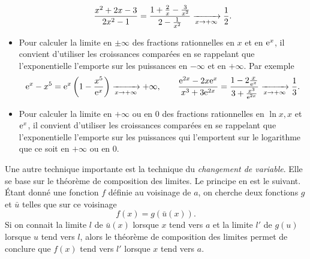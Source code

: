 \documentclass{magnoliaold}
\begin{document}
\begin{remarques}
\begin{itemize}
 $$\frac{x^2+2x-3}{2x^2-1}=\frac{1+\frac{2}{x}-\frac{3}{x^2}}
                           {2-\frac{1}{x^2}}\xrightarrow[x\rightarrow +\infty]{}\frac{1}{2}.$$
\item Pour calculer la limite en $\pm\infty$ des fractions rationnelles en $x$
  et en ${\rm e}^x$, il convient d'utiliser les croissances comparées en se
  rappelant que l'exponentielle l'emporte sur les puissances
  en $-\infty$ et en $+\infty$. Par exemple
  \[{\rm e}^x-x^5={\rm e}^x\left(1-\frac{x^5}{{\rm e}^x}\right)\xrightarrow[x\rightarrow +\infty]{} +\infty, \qquad
    \frac{{\rm e}^{2x}-2x{\rm e}^x}{x^3+3{\rm e}^{2x}}=\frac{1-2\frac{x}{{\rm e}^x}}
    {3+\frac{x^3}{{\rm e}^{2x}}}\xrightarrow[x\rightarrow +\infty]{}\frac{1}{3}.\]
\item Pour calculer la limite en $+\infty$ ou en $0$ des fractions rationnelles
  en $\ln x,x$ et ${\rm e}^x$, il convient d'utiliser les croissances comparées en se
  rappelant que l'exponentielle l'emporte sur les puissances
  qui l'emportent sur le logarithme que ce soit en $+\infty$ ou en $0$.
\end{itemize}
\remarque Une autre technique importante est la technique du \emph{changement de variable}. Elle
se base sur le théorème de composition des limites. Le principe en est le suivant.
Étant donné une fonction $f$ définie
au voisinage de $a$, on cherche deux fonctions $g$ et $\bar{u}$ telles que sur
ce voisinage
$$f(x)=g(\bar{u}(x)).$$
Si on connait la limite $l$ de $\bar{u}(x)$ lorsque $x$ tend vers $a$ et la
limite $l'$ de $g(u)$ lorsque $u$ tend vers $l$, alors le théorème de
composition des limites permet de conclure que $f(x)$ tend vers $l'$ lorsque $x$ tend vers $a$.
\end{remarques}








\end{document}
